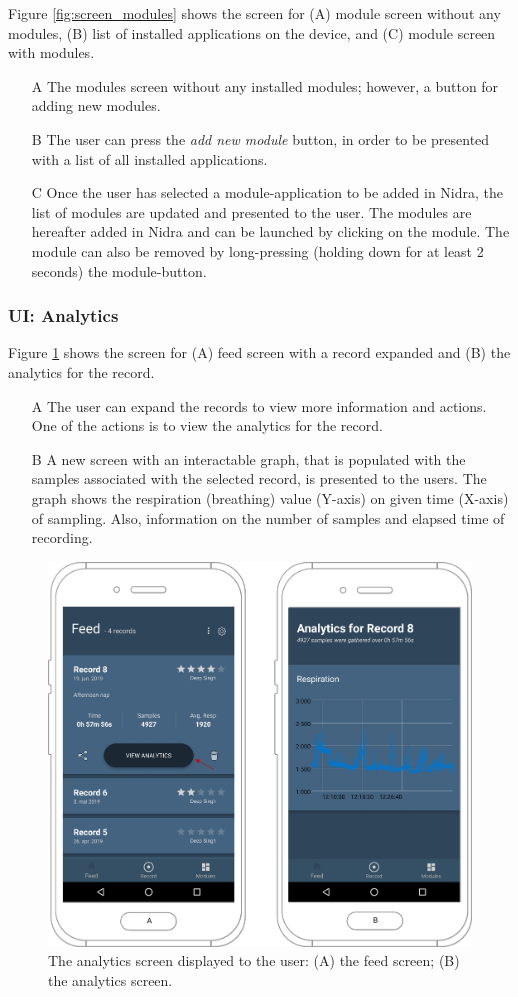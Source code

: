 Figure \ref{fig:screen_modules} shows the screen for (A) module screen without any modules, (B) list of installed applications on the device, and (C) module screen with modules. 

\begin{itemize}
    \item[A] The modules screen without any installed modules; however, a button for adding new modules.
    \item[B] The user can press the \textit{add new module} button, in order to be presented with a list of all installed applications. 
    \item[C] Once the user has selected a module-application to be added in Nidra, the list of modules are updated and presented to the user. The modules are hereafter added in Nidra and can be launched by clicking on the module. The module can also be removed by long-pressing (holding down for at least 2 seconds) the module-button.
\end{itemize}

\subsubsection{UI: Analytics}
Figure \ref{fig:screen_analytics} shows the screen for (A) feed screen with a record expanded and (B) the analytics for the record.

\begin{itemize}
    \item[A] The user can expand the records to view more information and actions. One of the actions is to view the analytics for the record.
    \item[B] A new screen with an interactable graph, that is populated with the samples associated with the selected record, is presented to the users. The graph shows the respiration (breathing) value (Y-axis) on given time (X-axis) of sampling. Also, information on the number of samples and elapsed time of recording. 
\end{itemize}

\begin{figure}[!h]
    \centering
    \includegraphics[scale=0.26]{images/Analytics_img.pdf}
    \caption{The analytics screen displayed to the user: (A) the feed screen; (B) the analytics screen.}
    \label{fig:screen_analytics}
\end{figure}
